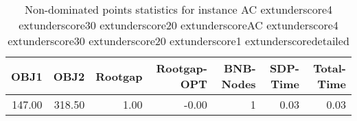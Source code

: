 \begin{table}
\caption{Non-dominated points statistics for instance AC	extunderscore4	extunderscore30	extunderscore20	extunderscoreAC	extunderscore4	extunderscore30	extunderscore20	extunderscore1	extunderscoredetailed}
\label{tab:stats/AC_4_30_20_AC_4_30_20_1_detailed}
\begin{tabular}{rrrrrrr}
\toprule
OBJ1 & OBJ2 & Rootgap & Rootgap-OPT & BNB-Nodes & SDP-Time & Total-Time \\
\midrule
147.00 & 318.50 & 1.00 & -0.00 & 1 & 0.03 & 0.03 \\
\bottomrule
\end{tabular}
\end{table}
